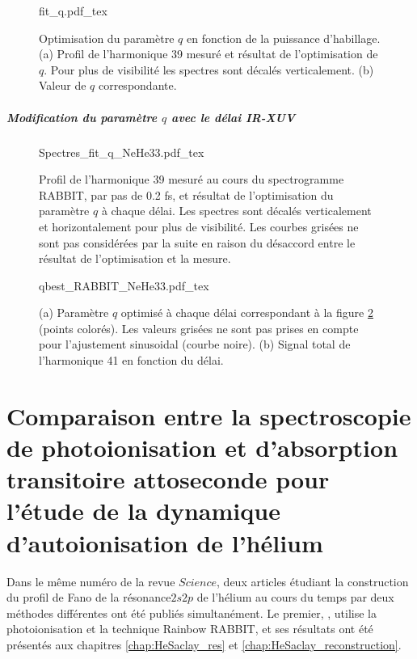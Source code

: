 \begin{figure}
\centering
\def\svgwidth{\textwidth}
{fit_q.pdf_tex}
\caption{Optimisation du paramètre $q$ en fonction de la puissance d'habillage. (a) Profil de l'harmonique 39 mesuré et résultat de l'optimisation de $q$. Pour plus de visibilité les spectres sont décalés verticalement. (b) Valeur de $q$ correspondante.}
\label{fig:fit_q}
\end{figure}

\paragraph*{Modification du paramètre $q$ avec le délai IR-XUV}
\begin{figure}[ht]
\centering
\def\svgwidth{\textwidth}
{Spectres_fit_q_NeHe33.pdf_tex}
\caption{Profil de l'harmonique 39 mesuré au cours du spectrogramme RABBIT, par pas de 0.2 fs, et résultat de l'optimisation du paramètre $q$ à chaque délai. Les spectres sont décalés verticalement et horizontalement pour plus de visibilité. Les courbes grisées ne sont pas considérées par la suite en raison du désaccord entre le résultat de l'optimisation et la mesure.}
\label{fig:Spectres_fit_q_NeHe33}
\end{figure}

\begin{figure}[ht]
\centering
\def\svgwidth{0.8\textwidth}
{qbest_RABBIT_NeHe33.pdf_tex}
\caption{(a) Paramètre $q$ optimisé à chaque délai correspondant à la figure \ref{fig:Spectres_fit_q_NeHe33} (points colorés). Les valeurs grisées ne sont pas prises en compte pour l'ajustement sinusoidal (courbe noire). (b) Signal total de l'harmonique 41 en fonction du délai.}
\label{fig:qbest_RABBIT_NeHe33}
\end{figure}






\chapter{Comparaison entre la spectroscopie de photoionisation et d'absorption transitoire attoseconde pour l'étude de la dynamique d'autoionisation de l'hélium}
Dans le même numéro de la revue $Science$, deux articles étudiant la construction du profil de Fano de la résonance$2s2p$ de l'hélium au cours du temps par deux méthodes différentes ont été publiés simultanément. Le premier, , utilise la photoionisation et la technique Rainbow RABBIT, et ses résultats ont été présentés aux chapitres \ref{chap:HeSaclay_res} et \ref{chap:HeSaclay_reconstruction}. 


